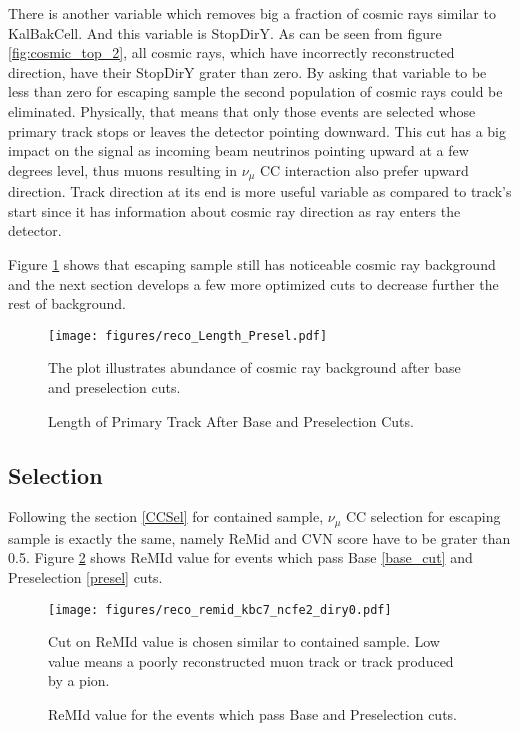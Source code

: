 There is another variable which removes big a fraction of cosmic rays similar to KalBakCell. And this variable 
is StopDirY. As can be seen from figure \ref{fig:cosmic_top_2}, all cosmic rays, which have incorrectly reconstructed
direction, have their StopDirY grater than zero. By asking that variable to be less than zero for escaping 
sample the second population of cosmic rays could be eliminated. Physically, that means that only those events
are selected whose primary track stops or leaves the detector pointing downward. This cut has a big impact
on the signal as incoming beam neutrinos pointing upward at a few degrees level, thus muons resulting in $\nu_\mu$
CC interaction also prefer upward direction. Track direction at its end is more useful variable as compared to
track's start since it has information about cosmic ray direction as ray enters the detector. 

Figure \ref{fig:length_2} shows that escaping sample still has noticeable cosmic ray background and the next 
section develops a few more optimized cuts to decrease further the rest of background.

\begin{figure}[!h]
\centering
\texttt{[image: figures/reco\_Length\_Presel.pdf]}
\caption{Length of Primary Track After Base and Preselection Cuts.}
{The plot illustrates abundance of cosmic ray background after base and preselection cuts. }
\label{fig:length_2}
\end{figure}

\subsection{Selection}
Following the section \ref{CCSel} for contained sample, $\nu_\mu$ CC selection for escaping sample is exactly 
the same, namely ReMid and CVN score have to be grater than 0.5. Figure \ref{fig:remid} shows ReMId value for
events which pass Base \ref{base_cut} and Preselection \ref{presel} cuts. 
\begin{figure}[h]
\centering
\texttt{[image: figures/reco\_remid\_kbc7\_ncfe2\_diry0.pdf]}
\caption{ReMId value for the events which pass Base and Preselection cuts.}
{Cut on ReMId value is chosen similar to contained sample. Low value means a poorly reconstructed muon track or
track produced by a pion. }
\label{fig:remid}
\end{figure}

